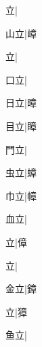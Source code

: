 \begin{multicols}{2}
{{立}\mktsJzrVerticalBar{}{\cjk{}{\cnsym{}　}{\cnsym{}　}{\cnsym{}　}}|{}\par
{\cjk{}{\cnsym{}　}山立}\mktsJzrVerticalBar{}{\cjk{}{\cnsym{}　}{\cnsym{}　}{\cnsym{}　}}|{\cjk{}嶂}\par
{立}\mktsJzrVerticalBar{}{\cjk{}{\cnsym{}　}{\cnsym{}　}{\cnsym{}　}}|{}\par
{\cjk{}{\cnsym{}　}口立}\mktsJzrVerticalBar{}{\cjk{}{\cnsym{}　}{\cnsym{}　}{\cnsym{}　}}|{}\par
{\cjk{}{\cnsym{}　}日立}\mktsJzrVerticalBar{}{\cjk{}{\cnsym{}　}{\cnsym{}　}{\cnsym{}　}}|{\cjk{}暲}\par
{\cjk{}{\cnsym{}　}目立}\mktsJzrVerticalBar{}{\cjk{}{\cnsym{}　}{\cnsym{}　}{\cnsym{}　}}|{\cjk{}瞕}\par
{\cjk{}{\cnsym{}　}門立}\mktsJzrVerticalBar{}{\cjk{}{\cnsym{}　}{\cnsym{}　}{\cnsym{}　}}|{}\par
{\cjk{}{\cnsym{}　}虫立}\mktsJzrVerticalBar{}{\cjk{}{\cnsym{}　}{\cnsym{}　}{\cnsym{}　}}|{\cjk{}蟑}\par
{\cjk{}{\cnsym{}　}巾立}\mktsJzrVerticalBar{}{\cjk{}{\cnsym{}　}{\cnsym{}　}{\cnsym{}　}}|{\cjk{}幛}\par
{\cjk{}{\cnsym{}　}血立}\mktsJzrVerticalBar{}{\cjk{}{\cnsym{}　}{\cnsym{}　}{\cnsym{}　}}|{}\par
{立}\mktsJzrVerticalBar{}{\cjk{}{\cnsym{}　}{\cnsym{}　}{\cnsym{}　}}|{\cjk{}傽}\par
{立}\mktsJzrVerticalBar{}{\cjk{}{\cnsym{}　}{\cnsym{}　}{\cnsym{}　}}|{}\par
{\cjk{}{\cnsym{}　}金立}\mktsJzrVerticalBar{}{\cjk{}{\cnsym{}　}{\cnsym{}　}{\cnsym{}　}}|{\cjk{}鏱}\par
{立}\mktsJzrVerticalBar{}{\cjk{}{\cnsym{}　}{\cnsym{}　}{\cnsym{}　}}|{\cjk{}獐}\par
{\cjk{}{\cnsym{}　}鱼立}\mktsJzrVerticalBar{}{\cjk{}{\cnsym{}　}{\cnsym{}　}{\cnsym{}　}}|{}\par
}
\end{multicols}

